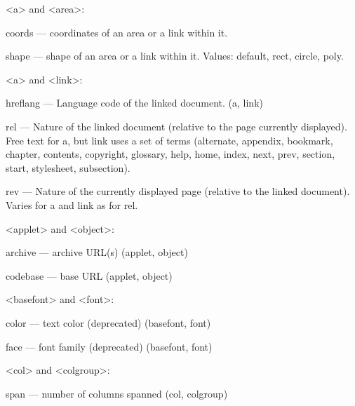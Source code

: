 \begin{compactitem}
\item <a> and <area>:

	\begin{compactitem}
	\item coords — coordinates of an area or a link within it.
	\item shape — shape of an area or a link within it. Values: default, rect, circle, poly.
	\end{compactitem}

\item <a> and <link>:

	\begin{compactitem}
	\item hreflang — Language code of the linked document. (a, link)
	\item rel — Nature of the linked document (relative to the page currently displayed). Free text for a, but link uses a set of terms (alternate, appendix, bookmark, chapter, contents, copyright, glossary, help, home, index, next, prev, section, start, stylesheet, subsection).
	\item rev — Nature of the currently displayed page (relative to the linked document). Varies for a and link as for rel.
	\end{compactitem}

\item <applet> and <object>:

	\begin{compactitem}
	\item archive — archive URL(s) (applet, object)
	\item codebase — base URL (applet, object)
	\end{compactitem}
	
\item <basefont> and <font>:
	
	\begin{compactitem}
	\item color — text color (deprecated) (basefont, font)
	\item face — font family (deprecated) (basefont, font)
	\end{compactitem}
	
\item <col> and <colgroup>:
	
	\begin{compactitem}
	\item span — number of columns spanned (col, colgroup)
	\end{compactitem}
	

\end{compactitem}
